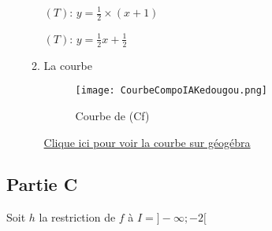\documentclass[12pt,a4paper]{article}
\begin{document}
\begin{enumerate}
\begin{enumerate}
\( (T) \): \( y = \frac{1}{2} \times (x+1) \)

\( (T) \): \( y = \frac{1}{2}x+\frac{1}{2} \)
\item La courbe 
\begin{center}
\begin{figure}[H]%
\centering
\texttt{[image: CourbeCompoIAKedougou.png]}
\caption{Courbe de (Cf)}
\label{fig:monimage}
\end{figure}
\href{https://www.geogebra.org/classic/ud3zvetx}{Clique ici pour voir la courbe sur géogébra}\\
\end{center}
\end{enumerate}

\end{enumerate}

\subsection*{Partie C}

Soit \( h \) la restriction de \( f \) à \( I = ]-\infty; -2 [ \)
\end{document}
